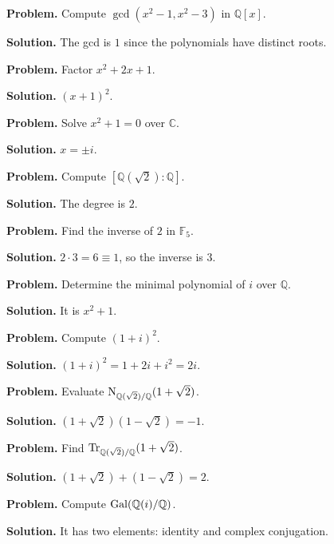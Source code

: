 \begin{example}\label{ex:sec10-1}
\textbf{Problem.} Compute $\gcd(x^2-1,x^2-3)$ in $\mathbb{Q}[x]$.

\textbf{Solution.} The gcd is $1$ since the polynomials have distinct roots.
\end{example}

\begin{example}\label{ex:sec10-2}
\textbf{Problem.} Factor $x^2+2x+1$.

\textbf{Solution.} $(x+1)^2$.
\end{example}

\begin{example}\label{ex:sec10-3}
\textbf{Problem.} Solve $x^2+1=0$ over $\mathbb{C}$.

\textbf{Solution.} $x=\pm i$.
\end{example}

\begin{example}\label{ex:sec10-4}
\textbf{Problem.} Compute $[\mathbb{Q}(\sqrt{2}):\mathbb{Q}]$.

\textbf{Solution.} The degree is $2$.
\end{example}

\begin{example}\label{ex:sec10-5}
\textbf{Problem.} Find the inverse of $2$ in $\mathbb{F}_5$.

\textbf{Solution.} $2\cdot3=6\equiv1$, so the inverse is $3$.
\end{example}

\begin{example}\label{ex:sec10-6}
\textbf{Problem.} Determine the minimal polynomial of $i$ over $\mathbb{Q}$.

\textbf{Solution.} It is $x^2+1$.
\end{example}

\begin{example}\label{ex:sec10-7}
\textbf{Problem.} Compute $(1+i)^2$.

\textbf{Solution.} $(1+i)^2=1+2i+i^2=2i$.
\end{example}

\begin{example}\label{ex:sec10-8}
\textbf{Problem.} Evaluate $\operatorname{N}_{\mathbb{Q}(\sqrt{2})/\mathbb{Q}}(1+\sqrt{2})$.

\textbf{Solution.} $(1+\sqrt{2})(1-\sqrt{2})=-1$.
\end{example}

\begin{example}\label{ex:sec10-9}
\textbf{Problem.} Find $\operatorname{Tr}_{\mathbb{Q}(\sqrt{2})/\mathbb{Q}}(1+\sqrt{2})$.

\textbf{Solution.} $(1+\sqrt{2})+(1-\sqrt{2})=2$.
\end{example}

\begin{example}\label{ex:sec10-10}
\textbf{Problem.} Compute $\operatorname{Gal}(\mathbb{Q}(i)/\mathbb{Q})$.

\textbf{Solution.} It has two elements: identity and complex conjugation.
\end{example}
